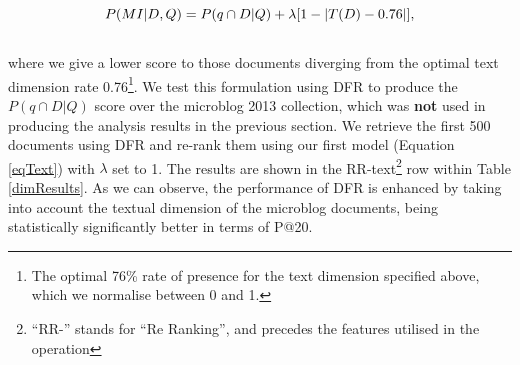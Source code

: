 \begin{equation}
P(MI|D,Q) = P(q \cap D|Q) + \lambda [1- \abs{T(D)-0.76}],
\label{eqText}
\end{equation}\\



\noindent where we give a lower score to those documents diverging from the optimal text dimension rate 0.76\footnote{The optimal 76\% rate of presence for the text dimension specified above, which we normalise between 0 and 1.}. We test this formulation using DFR to produce the \(P(q \cap D|Q)\) score over the microblog 2013 collection, which was \textbf{not} used in producing the analysis results in the previous section. We retrieve the first 500 documents using DFR and re-rank them using our first model (Equation \ref{eqText}) with \(\lambda\) set to 1. The results are shown in the RR-text\footnote{``RR-'' stands for ``Re Ranking'', and precedes the features utilised in the operation} row within Table \ref{dimResults}. As we can observe, the performance of DFR is enhanced by taking into account the textual dimension of the microblog documents, being statistically significantly better in terms of P@20.

